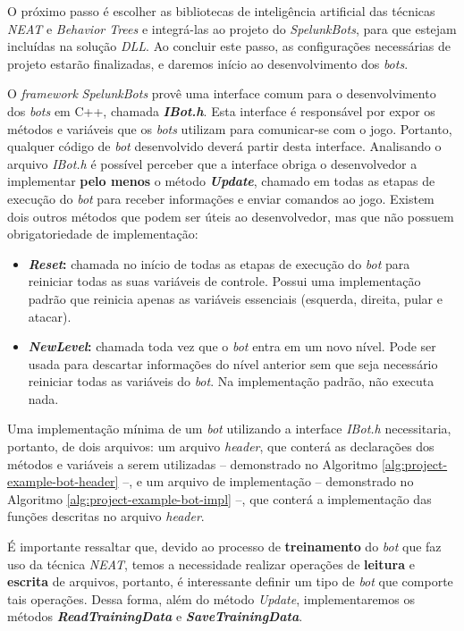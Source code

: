 O próximo passo é escolher as bibliotecas de inteligência artificial das
técnicas \textit{NEAT} e \textit{Behavior Trees} e integrá-las ao projeto do
\textit{SpelunkBots}, para que estejam incluídas na solução \textit{DLL}. Ao
concluir este passo, as configurações necessárias de projeto estarão
finalizadas, e daremos início ao desenvolvimento dos \textit{bots}.

O \textit{framework} \textit{SpelunkBots} provê uma interface comum para o
desenvolvimento dos \textit{bots} em C++, chamada \textbf{\textit{IBot.h}}. Esta
interface é responsável por expor os métodos e variáveis que os \textit{bots}
utilizam para comunicar-se com o jogo. Portanto, qualquer código de \textit{bot}
desenvolvido deverá partir desta interface. Analisando o arquivo \textit{IBot.h}
é possível perceber que a interface obriga o desenvolvedor a implementar
\textbf{pelo menos} o método \textbf{\textit{Update}}, chamado em todas as
etapas de execução do \textit{bot} para receber informações e enviar comandos ao
jogo. Existem dois outros métodos que podem ser úteis ao desenvolvedor, mas que
não possuem obrigatoriedade de implementação:

\begin{itemize}
	\item
		\textbf{\textit{Reset}:} chamada no início de todas as etapas de
		execução do \textit{bot} para reiniciar todas as suas variáveis de
		controle. Possui uma implementação padrão que reinicia apenas as
		variáveis essenciais (esquerda, direita, pular e atacar).

	\item
		\textbf{\textit{NewLevel}:} chamada toda vez que o \textit{bot} entra em
		um novo nível. Pode ser usada para descartar informações do nível
		anterior sem que seja necessário reiniciar todas as variáveis do
		\textit{bot}. Na implementação padrão, não executa nada.
\end{itemize}

Uma implementação mínima de um \textit{bot} utilizando a interface
\textit{IBot.h} necessitaria, portanto, de dois arquivos: um arquivo
\textit{header}, que conterá as declarações dos métodos e variáveis a serem
utilizadas -- demonstrado no Algoritmo \ref{alg:project-example-bot-header} --,
e um arquivo de implementação -- demonstrado no Algoritmo
\ref{alg:project-example-bot-impl} --, que conterá a implementação das funções
descritas no arquivo \textit{header}.

É importante ressaltar que, devido ao processo de \textbf{treinamento} do
\textit{bot} que faz uso da técnica \textit{NEAT}, temos a necessidade realizar
operações de \textbf{leitura} e \textbf{escrita} de arquivos, portanto, é
interessante definir um tipo de \textit{bot} que comporte tais operações. Dessa
forma, além do método \textit{Update}, implementaremos os métodos
\textbf{\textit{ReadTrainingData}} e \textbf{\textit{SaveTrainingData}}.

